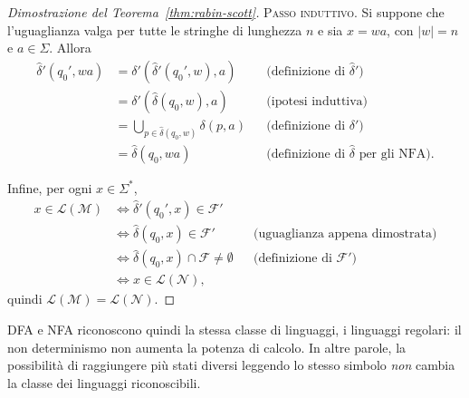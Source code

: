 \documentclass[a4paper, 11pt, oneside]{book}
\theoremstyle{formale}
\begin{document}
\begin{proof}[Dimostrazione del Teorema~\ref{thm:rabin-scott}]
        \textsc{Passo induttivo}. Si suppone che l'uguaglianza valga per tutte le stringhe
        di lunghezza $n$ e sia $x = wa$, con $|w| = n$ e $a \in \Sigma$. Allora
        \begin{align*}
            \hat{\delta}'(q_0', wa)
                &= \delta'(\hat{\delta}'(q_0', w), a)
                    && \text{(definizione di $\hat{\delta}'$)} \\
                &= \delta'(\hat{\delta}(q_0, w), a)
                    && \text{(ipotesi induttiva)} \\
                &= \bigcup_{p \in \hat{\delta}(q_0, w)} \delta(p, a)
                    && \text{(definizione di $\delta'$)} \\
                &= \hat{\delta}(q_0, wa)
                    && \text{(definizione di $\hat{\delta}$ per gli NFA)}.
        \end{align*}

        Infine, per ogni $x \in \Sigma^*$,
        \begin{align*}
            x \in \mathcal{L}(\mathcal{M})
                &\iff \hat{\delta}'(q_0', x) \in \mathcal{F}' \\
                &\iff \hat{\delta}(q_0, x) \in \mathcal{F}'
                    && \text{(uguaglianza appena dimostrata)} \\
                &\iff \hat{\delta}(q_0, x) \cap \mathcal{F} \neq \emptyset
                    && \text{(definizione di $\mathcal{F}'$)} \\
                &\iff x \in \mathcal{L}(\mathcal{N}),
        \end{align*}
        quindi $\mathcal{L}(\mathcal{M}) = \mathcal{L}(\mathcal{N})$.
    \end{proof}

    DFA e NFA riconoscono quindi la stessa classe di linguaggi, i linguaggi regolari: il
    non determinismo non aumenta la potenza di calcolo. In altre parole, la possibilit\`a
    di raggiungere pi\`u stati diversi leggendo lo stesso simbolo \emph{non} cambia la
    classe dei linguaggi riconoscibili.
\end{document}
